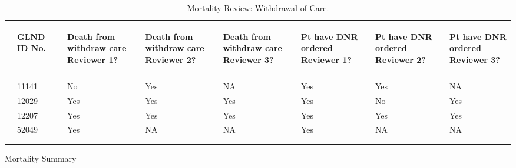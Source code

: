 \documentclass[dvips, 10pt]{article}
\begin{document}
\begin{table}[t]
\caption
{ Mortality Review: Withdrawal of Care. }
\begin{center}
\begin{tabular}{ @{}l@{}
@{}l@{}@{}p{1.5em}@{}@{}p{0.9in}@{}@{}p{1.5em}@{}@{}p{0.9in}@{}@{}p{1.5em}@{}@{}p{0.9in}@{}@{}p{1.5em}@{}@{}p{0.9in}@{}@{}p{1.5em}@{}@{}p{0.9in}@{}@{}p{1.5em}@{}@{}p{0.9in}@{}
}
\hline

& \parbox{6em}{\begin{center}GLND ID No.\end{center}} && \parbox{6em}{\begin{center}Death from withdraw care Reviewer 1?\end{center}} && \parbox{6em}{\begin{center}Death from withdraw care Reviewer 2?\end{center}} && \parbox{6em}{\begin{center}Death from withdraw care Reviewer 3?\end{center}} && \parbox{6em}{\begin{center}Pt have DNR ordered Reviewer 1?\end{center}} && \parbox{6em}{\begin{center}Pt have DNR ordered Reviewer 2?\end{center}} && \parbox{6em}{\begin{center}Pt have DNR ordered Reviewer 3?\end{center}} \\

\hline

\\
& 11141 && No && Yes && NA && Yes && Yes && NA \\
& 12029 && Yes && Yes && Yes && Yes && No && Yes \\
& 12207 && Yes && Yes && Yes && Yes && Yes && Yes \\
& 52049 && Yes && NA && NA && Yes && NA && NA \\
\\
\hline \\

\end{tabular}

\end{center}
 \end{table}
\clearpage

\begin{table}
\caption{Mortality Summary}
\end{table}
\clearpage
\end{document}

